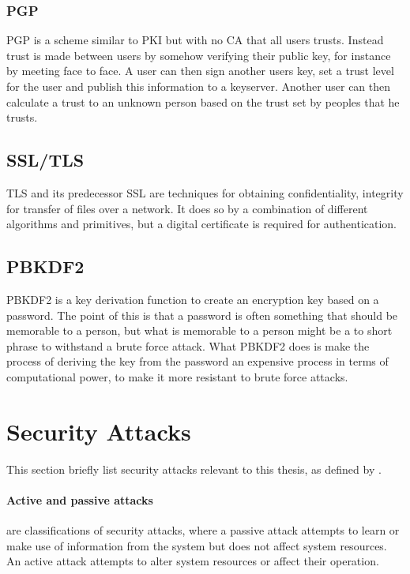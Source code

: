 \documentclass[pdftex,english,10pt,b5paper,twoside]{book}
\begin{document}
\subsubsection{PGP} \ac{PGP} is a scheme similar to \ac{PKI} but with no
\ac{CA} that all users trusts\cite{stallings}. Instead trust is made between
users by somehow verifying their public key, for instance by meeting face to
face. A user can then sign another users key, set a trust level for the user
and publish this information to a keyserver. Another user can then calculate a
trust to an unknown person based on the trust set by peoples that he trusts.

\subsection{SSL/TLS}
\ac{TLS} and its predecessor \ac{SSL} are techniques for obtaining
confidentiality, integrity for transfer of files over a
network\cite{stallings}. It does so by a combination of different algorithms
and primitives, but a digital certificate is required for authentication.

\subsection{PBKDF2}
\ac{PBKDF2} is a key derivation function to create an encryption key based on
a password. The point of this is that a password is often something that should
be memorable to a person, but what is memorable to a person might be a to short
phrase to withstand a brute force attack. What \ac{PBKDF2} does is make the
process of deriving the key from the password an expensive process in terms of
computational power, to make it more resistant to brute force attacks.

\section{Security Attacks}
This section briefly list security attacks relevant to this thesis, as defined
by \citeauthor{stallings}.

\paragraph{Active and passive attacks} are classifications of security attacks,
where a passive attack attempts to learn or make use of information from the
system but does not affect system resources. An active attack attempts to alter
system resources or affect their operation.
\end{document}
